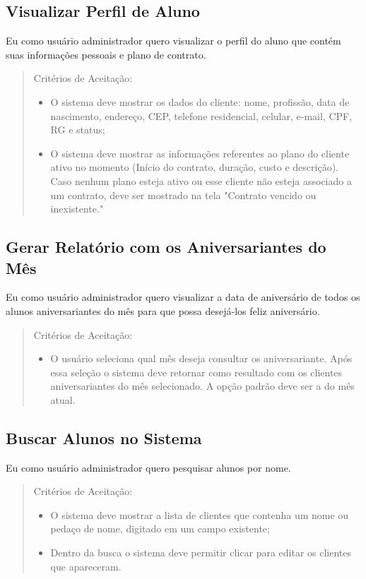 \subsection[Visualizar Perfil de Aluno]{Visualizar Perfil de Aluno}
Eu como usuário administrador quero visualizar o perfil do aluno que contém suas
informações pessoais e plano de contrato.

\begin{quote}
Critérios de Aceitação:
    \begin{itemize}
        \item O sistema deve mostrar os dados do cliente: nome, profissão, data de nascimento, endereço, CEP, telefone residencial, celular, e-mail, CPF, RG e status;
        \item O sistema deve mostrar as informações referentes ao plano do cliente ativo no momento (Início do contrato, duração,  custo e descrição). Caso nenhum plano esteja ativo ou esse cliente não esteja associado a um contrato, deve ser mostrado na tela "Contrato vencido ou inexistente."
    \end{itemize}
\end{quote}

\subsection[Gerar Relatório com os Aniversariantes do Mês]{Gerar Relatório com os Aniversariantes do Mês}
Eu como usuário administrador quero visualizar a data de aniversário de todos os
alunos aniversariantes do mês para que possa desejá-los feliz aniversário.

\begin{quote}
Critérios de Aceitação:
    \begin{itemize}
        \item O usuário seleciona qual mês deseja consultar os aniversariante. Após essa seleção o sistema deve retornar como resultado com os clientes aniversariantes do mês selecionado. A opção padrão deve ser a do mês atual.
    \end{itemize}
\end{quote}

\subsection[Buscar Alunos no Sistema]{Buscar Alunos no Sistema}
Eu como usuário administrador quero pesquisar alunos por nome.

\begin{quote}
Critérios de Aceitação:
    \begin{itemize}
        \item O sistema deve mostrar a lista de clientes que contenha um nome ou pedaço de
        nome, digitado em um campo existente;
        \item Dentro da busca o sistema deve permitir clicar para editar os clientes que
        apareceram.
    \end{itemize}
\end{quote}
